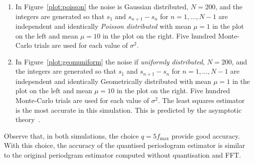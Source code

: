\documentclass[a4paper,10pt]{article}
\begin{document}
\begin{enumerate}
\begin{enumerate}
\item In Figure~\ref{plot:poisson} the noise is Gaussian distributed, $N=200$, and the integers are generated so that $s_1$ and $s_{n+1} - s_n$ for $n=1,\dots,N-1$ are independent and identically \emph{Poisson distributed} with mean $\mu = 1$ in the plot on the left and mean $\mu=10$ in the plot on the right.  Five hundred Monte-Carlo trials are used for each value of $\sigma^2$.
\item In Figure~\ref{plot:geomuniform} the noise if \emph{uniformly distributed}, $N=200$, and the integers are generated so that $s_1$ and $s_{n+1} - s_n$ for $n=1,\dots,N-1$ are independent and identically Geometrically distributed with mean $\mu = 1$ in the plot on the left and mean $\mu=10$ in the plot on the right.  Five hundred Monte-Carlo trials are used for each value of $\sigma^2$.   The least squares estimator is the most accurate in this simulation. This is predicted by the asymptotic theory~\cite{Quinn_sparse_noisy_SSP_2012,Quinn20013asilomar_period_est}.
\end{enumerate}

Observe that, in both simulations, the choice $q=5 f_{\text{max}}$ provide good accuracy. With this choice, the accuracy of the quantised periodogram estimator is similar to the original periodgram estimator computed without quantisation and FFT.  %



\end{enumerate}
\end{document}
